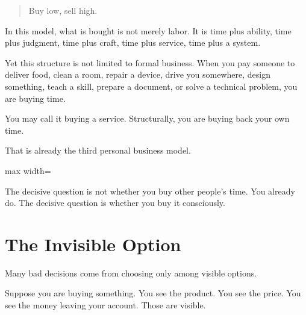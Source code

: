 \begin{quote}
Buy low, sell high.
\end{quote}

In this model, what is bought is not merely labor. It is time plus ability, time plus judgment, time plus craft, time plus service, time plus a system.

Yet this structure is not limited to formal business. When you pay someone to deliver food, clean a room, repair a device, drive you somewhere, design something, teach a skill, prepare a document, or solve a technical problem, you are buying time.

You may call it buying a service. Structurally, you are buying back your own time.

That is already the third personal business model.

\begin{center}
\begin{adjustbox}{max width=\linewidth}
\end{adjustbox}
\end{center}

The decisive question is not whether you buy other people's time. You already do. The decisive question is whether you buy it consciously.

\section*{The Invisible Option}

Many bad decisions come from choosing only among visible options.

Suppose you are buying something. You see the product. You see the price. You see the money leaving your account. Those are visible.

